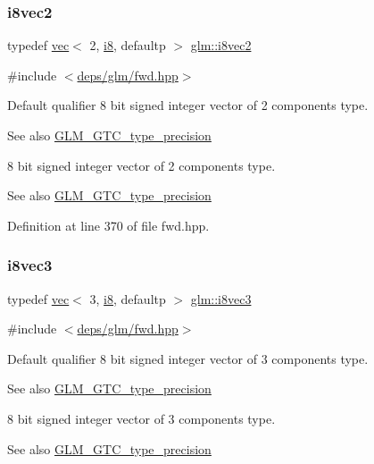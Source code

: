 \subsubsection{\texorpdfstring{i8vec2}{i8vec2}}
{\footnotesize\ttfamily typedef \hyperlink{structglm_1_1vec}{vec}$<$ 2, \hyperlink{group__gtc__type__precision_gaae064be68b7d36cd7910c16e8ad18bba}{i8}, defaultp $>$ \hyperlink{group__gtc__type__precision_gade57e4b55fe2b2345a4f2ac2b149cd32}{glm\+::i8vec2}}



{\ttfamily \#include $<$\hyperlink{fwd_8hpp}{deps/glm/fwd.\+hpp}$>$}

Default qualifier 8 bit signed integer vector of 2 components type. \begin{DoxySeeAlso}{See also}
\hyperlink{group__gtc__type__precision}{G\+L\+M\+\_\+\+G\+T\+C\+\_\+type\+\_\+precision}
\end{DoxySeeAlso}
8 bit signed integer vector of 2 components type. \begin{DoxySeeAlso}{See also}
\hyperlink{group__gtc__type__precision}{G\+L\+M\+\_\+\+G\+T\+C\+\_\+type\+\_\+precision} 
\end{DoxySeeAlso}


Definition at line 370 of file fwd.\+hpp.

\mbox{\label{group__gtc__type__precision_ga9babb834daa1f84c23821bd21669c2e8}} 
\subsubsection{\texorpdfstring{i8vec3}{i8vec3}}
{\footnotesize\ttfamily typedef \hyperlink{structglm_1_1vec}{vec}$<$ 3, \hyperlink{group__gtc__type__precision_gaae064be68b7d36cd7910c16e8ad18bba}{i8}, defaultp $>$ \hyperlink{group__gtc__type__precision_ga9babb834daa1f84c23821bd21669c2e8}{glm\+::i8vec3}}



{\ttfamily \#include $<$\hyperlink{fwd_8hpp}{deps/glm/fwd.\+hpp}$>$}

Default qualifier 8 bit signed integer vector of 3 components type. \begin{DoxySeeAlso}{See also}
\hyperlink{group__gtc__type__precision}{G\+L\+M\+\_\+\+G\+T\+C\+\_\+type\+\_\+precision}
\end{DoxySeeAlso}
8 bit signed integer vector of 3 components type. \begin{DoxySeeAlso}{See also}
\hyperlink{group__gtc__type__precision}{G\+L\+M\+\_\+\+G\+T\+C\+\_\+type\+\_\+precision} 
\end{DoxySeeAlso}


